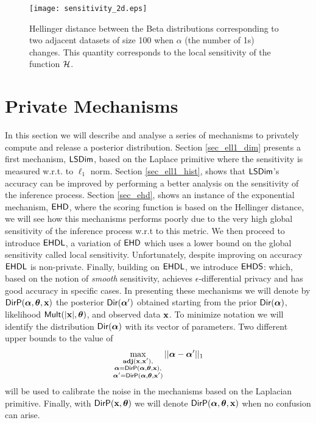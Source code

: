 \documentclass{article}
\begin{document}
\begin{figure}[ht]
\centering
\texttt{[image: sensitivity\_2d.eps]}
\caption{Hellinger distance between the Beta distributions
  corresponding to two adjacent datasets of size 100
  when  $\alpha$ (the number of 1s) changes. This quantity corresponds
  to the local sensitivity of the function $\mathcal{H}$.}
\label{fig_sensitivity}
\end{figure}



\section{Private Mechanisms}
\label{sec_mechs}
In this section we will describe and analyse a series of mechanisms to privately compute and release
a posterior distribution.
Section \ref{sec_ell1_dim} presents a first mechanism, $\mathsf{LSDim}$,
based on the Laplace primitive where the sensitivity is measured w.r.t. to $\ell_1$ norm.
Section \ref{sec_ell1_hist}, shows that $\mathsf{LSDim}$'s accuracy can be improved
by performing a better analysis on the sensitivity of the inference process.
Section \ref{sec_ehd}, shows an instance of the exponential mechanism, $\mathsf{EHD}$, where the scoring
function is based on the Hellinger distance, we will see how this mechanisms performs
poorly due to the very high global sensitivity of the inference process w.r.t to this metric.
We then proceed to introduce $\mathsf{EHDL}$, a variation of $\mathsf{EHD}$ which uses a lower bound
on the global sensitivity called local sensitivity.
Unfortunately, despite improving on accuracy $\mathsf{EHDL}$ is non-private.
Finally, building on $\mathsf{EHDL}$, we introduce $\mathsf{EHDS}$:
which, based on the notion of \emph{smooth} sensitivity, achieves $\epsilon$-differential privacy and
has good accuracy in specific cases.
In presenting these mechanisms we will denote by $\mathsf{DirP}(\boldsymbol{\alpha},\boldsymbol{\theta},\textbf{x})$ the posterior  $\mathsf{Dir}(\boldsymbol{\alpha}')$
obtained starting from the prior $\mathsf{Dir}(\boldsymbol{\alpha})$, likelihood $\mathsf{Mult}(|\textbf{x}|, \boldsymbol{\theta})$, and observed data $\textbf{x}$.
To minimize notation we will identify the distribution $\mathsf{Dir}(\boldsymbol{\alpha})$ with its vector
of parameters.
Two different upper bounds to the value of
\begin{align}
  \label{eqn:eq1}
  \max_{\substack{\textbf{adj}(\textbf{x},\textbf{x}'),\\
      \boldsymbol{\alpha}=\mathsf{DirP}(\boldsymbol{\alpha},\boldsymbol{\theta},\textbf{x}),\\
      \boldsymbol{\alpha}'=\mathsf{DirP}(\boldsymbol{\alpha},\boldsymbol{\theta},\textbf{x}')}}||\boldsymbol{\alpha}-\boldsymbol{\alpha}'||_1 
\end{align}
will be used to calibrate the noise in the mechanisms based on the Laplacian primitive.
Finally, with $\mathsf{DirP}(\textbf{x},\boldsymbol{\theta})$ we will denote $\mathsf{DirP}(\boldsymbol{\alpha},\boldsymbol{\theta},\textbf{x})$ when no confusion can arise.
\end{document}
